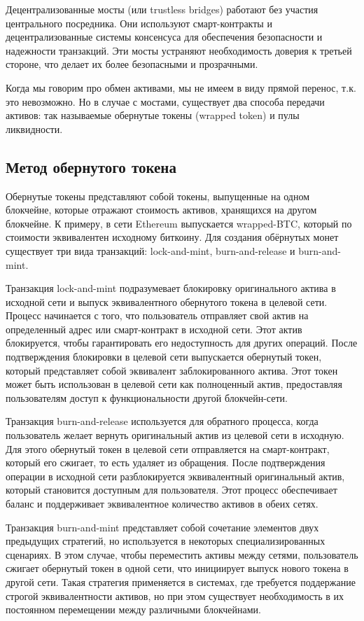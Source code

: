Децентрализованные мосты (или trustless bridges) работают без участия центрального посредника. Они используют смарт-контракты и децентрализованные системы консенсуса для обеспечения безопасности и надежности транзакций. Эти мосты устраняют необходимость доверия к третьей стороне, что делает их более безопасными и прозрачными.

Когда мы говорим про обмен активами, мы не имеем в виду прямой перенос, т.к. это невозможно. Но в случае с мостами, существует два способа передачи активов: так называемые обернутые токены (wrapped token) и пулы ликвидности.

\subsection{Метод обернутого токена}

Обернутые токены представляют собой токены, выпущенные на одном блокчейне, которые отражают стоимость активов, хранящихся на другом блокчейне. К примеру, в сети Ethereum выпускается wrapped-BTC, который по стоимости эквивалентен исходному биткоину. Для создания обёрнутых монет существует три вида транзакций: lock-and-mint, burn-and-release и burn-and-mint.

Транзакция lock-and-mint подразумевает блокировку оригинального актива в исходной сети и выпуск эквивалентного обернутого токена в целевой сети. Процесс начинается с того, что пользователь отправляет свой актив на определенный адрес или смарт-контракт в исходной сети. Этот актив блокируется, чтобы гарантировать его недоступность для других операций. После подтверждения блокировки в целевой сети выпускается обернутый токен, который представляет собой эквивалент заблокированного актива. Этот токен может быть использован в целевой сети как полноценный актив, предоставляя пользователям доступ к функциональности другой блокчейн-сети.

Транзакция burn-and-release используется для обратного процесса, когда пользователь желает вернуть оригинальный актив из целевой сети в исходную. Для этого обернутый токен в целевой сети отправляется на смарт-контракт, который его сжигает, то есть удаляет из обращения. После подтверждения операции в исходной сети разблокируется эквивалентный оригинальный актив, который становится доступным для пользователя. Этот процесс обеспечивает баланс и поддерживает эквивалентное количество активов в обеих сетях.

Транзакция burn-and-mint представляет собой сочетание элементов двух предыдущих стратегий, но используется в некоторых специализированных сценариях. В этом случае, чтобы переместить активы между сетями, пользователь сжигает обернутый токен в одной сети, что инициирует выпуск нового токена в другой сети. Такая стратегия применяется в системах, где требуется поддержание строгой эквивалентности активов, но при этом существует необходимость в их постоянном перемещении между различными блокчейнами.

